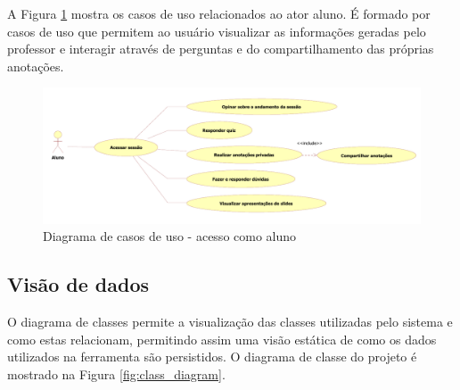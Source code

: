 A Figura \ref{fig:use_case3} mostra os casos de uso relacionados ao ator aluno. É formado por casos de uso que permitem ao usuário visualizar as informações geradas pelo professor e interagir através de perguntas e do compartilhamento das próprias anotações.

 
\begin{figure}[!h]
\centering
\includegraphics[width=1.0\textwidth]{pdfs/img-use-case3.pdf} 
\caption{Diagrama de casos de uso - acesso como aluno}
\label{fig:use_case3} 
\end{figure}

\subsection{Visão de dados}

O diagrama de classes permite a visualização das classes utilizadas pelo sistema e como estas relacionam, permitindo assim uma visão estática de como os dados utilizados na ferramenta são persistidos. O diagrama de classe do projeto é mostrado na Figura \ref{fig:class_diagram}.

 

